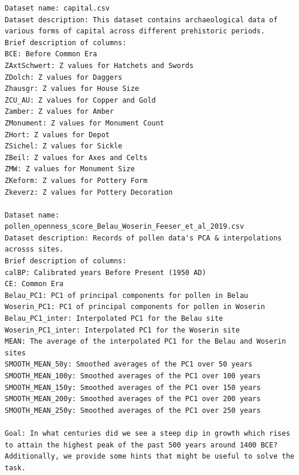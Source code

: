 \begin{verbatim}
Dataset name: capital.csv
Dataset description: This dataset contains archaeological data of various forms of capital across different prehistoric periods.
Brief description of columns: 
BCE: Before Common Era
ZAxtSchwert: Z values for Hatchets and Swords
ZDolch: Z values for Daggers
Zhausgr: Z values for House Size
ZCU_AU: Z values for Copper and Gold
Zamber: Z values for Amber
ZMonument: Z values for Monument Count
ZHort: Z values for Depot
ZSichel: Z values for Sickle
ZBeil: Z values for Axes and Celts
ZMW: Z values for Monument Size
ZKeform: Z values for Pottery Form
Zkeverz: Z values for Pottery Decoration

Dataset name: pollen_openness_score_Belau_Woserin_Feeser_et_al_2019.csv
Dataset description: Records of pollen data's PCA & interpolations acrosss sites.
Brief description of columns: 
calBP: Calibrated years Before Present (1950 AD)
CE: Common Era
Belau_PC1: PC1 of principal components for pollen in Belau
Woserin_PC1: PC1 of principal components for pollen in Woserin
Belau_PC1_inter: Interpolated PC1 for the Belau site
Woserin_PC1_inter: Interpolated PC1 for the Woserin site
MEAN: The average of the interpolated PC1 for the Belau and Woserin sites
SMOOTH_MEAN_50y: Smoothed averages of the PC1 over 50 years
SMOOTH_MEAN_100y: Smoothed averages of the PC1 over 100 years
SMOOTH_MEAN_150y: Smoothed averages of the PC1 over 150 years
SMOOTH_MEAN_200y: Smoothed averages of the PC1 over 200 years
SMOOTH_MEAN_250y: Smoothed averages of the PC1 over 250 years 

Goal: In what centuries did we see a steep dip in growth which rises to attain the highest peak of the past 500 years around 1400 BCE? Additionally, we provide some hints that might be useful to solve the task. 


\end{verbatim}
